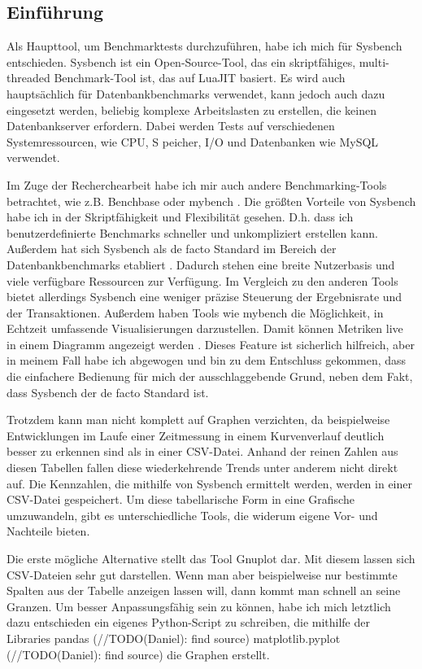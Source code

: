 \subsection{Einführung}\label{subsec:einfuhrung}

Als Haupttool, um Benchmarktests durchzuführen, habe ich mich für Sysbench \cite{sysbench_repo}
entschieden. Sysbench ist ein Open-Source-Tool, das ein skriptfähiges, multi-threaded Benchmark-Tool
ist, das auf LuaJIT basiert. Es wird auch hauptsächlich für Datenbankbenchmarks verwendet, kann
jedoch auch dazu eingesetzt werden, beliebig komplexe Arbeitslasten zu erstellen, die keinen
Datenbankserver erfordern. Dabei werden Tests auf verschiedenen Systemressourcen, wie CPU, S
peicher, I/O und Datenbanken wie MySQL \cite{sysbench_mysql} verwendet.

Im Zuge der Recherchearbeit habe ich mir auch andere Benchmarking-Tools betrachtet, wie z.B.
Benchbase \cite{DifallahPCC13} oder mybench \cite{mybench_repo}. Die größten Vorteile von
Sysbench habe ich in der Skriptfähigkeit und Flexibilität gesehen. D.h. dass ich benutzerdefinierte
Benchmarks schneller und unkompliziert erstellen kann. Außerdem hat sich Sysbench als de facto
Standard im Bereich der Datenbankbenchmarks etabliert \cite{mybench_comparison}. Dadurch stehen
eine breite Nutzerbasis und viele verfügbare Ressourcen zur Verfügung. Im Vergleich zu den
anderen Tools bietet allerdings Sysbench eine weniger präzise Steuerung der Ergebnisrate
und der Transaktionen. Außerdem haben Tools wie mybench die Möglichkeit, in Echtzeit umfassende
Visualisierungen darzustellen. Damit können Metriken live in einem Diagramm angezeigt werden
\cite{mybench_user_interface}. Dieses Feature ist sicherlich hilfreich, aber in meinem Fall habe
ich abgewogen und bin zu dem Entschluss gekommen, dass die einfachere Bedienung für mich der
ausschlaggebende Grund, neben dem Fakt, dass Sysbench der de facto Standard ist.

Trotzdem kann man nicht komplett auf Graphen verzichten, da beispielweise Entwicklungen
im Laufe einer Zeitmessung in einem Kurvenverlauf deutlich besser zu erkennen sind als in einer CSV-Datei.
Anhand der reinen Zahlen aus diesen Tabellen fallen diese wiederkehrende Trends unter anderem nicht direkt auf.
Die Kennzahlen, die mithilfe von Sysbench ermittelt werden, werden in einer CSV-Datei gespeichert.
Um diese tabellarische Form in eine Grafische umzuwandeln, gibt es unterschiedliche Tools, die widerum
eigene Vor- und Nachteile bieten.

Die erste mögliche Alternative stellt das Tool Gnuplot \cite{gnuplot} dar.
Mit diesem lassen sich CSV-Dateien sehr gut darstellen. Wenn man aber beispielweise nur bestimmte Spalten
aus der Tabelle anzeigen lassen will, dann kommt man schnell an seine Granzen.
Um besser Anpassungsfähig sein zu können, habe ich mich letztlich dazu entschieden ein eigenes Python-Script
zu schreiben, die mithilfe der Libraries pandas (//TODO(Daniel): find source) matplotlib.pyplot (//TODO(Daniel): find source)
die Graphen erstellt.

